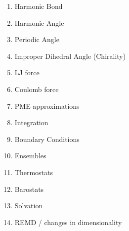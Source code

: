  
\begin{enumerate}
\item Harmonic Bond
\item Harmonic Angle
\item Periodic Angle
\item Improper Dihedral Angle (Chirality)
\item LJ force
\item Coulomb force
\item PME approximations
\item Integration
\item Boundary Conditions
\item Ensembles
\item Thermostats
\item Barostats
\item Solvation
\item REMD / changes in dimensionality
\end{enumerate}


\newpage